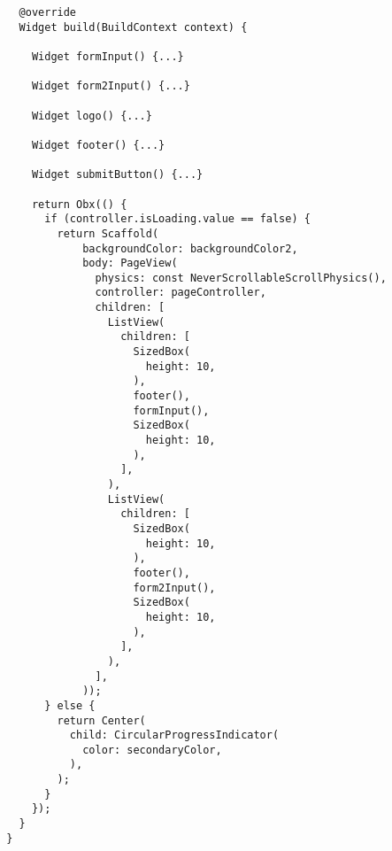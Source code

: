 \begin{lstlisting}
          @override
          Widget build(BuildContext context) {
        
            Widget formInput() {...}
        
            Widget form2Input() {...}
        
            Widget logo() {...}
        
            Widget footer() {...}
        
            Widget submitButton() {...}
        
            return Obx(() {
              if (controller.isLoading.value == false) {
                return Scaffold(
                    backgroundColor: backgroundColor2,
                    body: PageView(
                      physics: const NeverScrollableScrollPhysics(),
                      controller: pageController,
                      children: [
                        ListView(
                          children: [
                            SizedBox(
                              height: 10,
                            ),
                            footer(),
                            formInput(),
                            SizedBox(
                              height: 10,
                            ),
                          ],
                        ),
                        ListView(
                          children: [
                            SizedBox(
                              height: 10,
                            ),
                            footer(),
                            form2Input(),
                            SizedBox(
                              height: 10,
                            ),
                          ],
                        ),
                      ],
                    ));
              } else {
                return Center(
                  child: CircularProgressIndicator(
                    color: secondaryColor,
                  ),
                );
              }
            });
          }
        }        
	\end{lstlisting}

